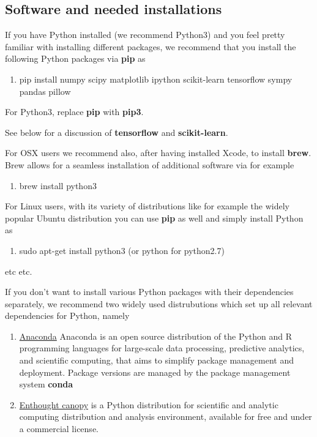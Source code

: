 \documentclass[%
oneside,                 %
final,                   %
10pt]{article}
\begin{document}
\noindent
\subsection*{Software and needed installations}

If you have Python installed (we recommend Python3) and you feel pretty familiar with installing different packages, 
we recommend that you install the following Python packages via \textbf{pip} as
\begin{enumerate}
\item pip install numpy scipy matplotlib ipython scikit-learn tensorflow sympy pandas pillow
\end{enumerate}

\noindent
For Python3, replace \textbf{pip} with \textbf{pip3}.

See below for a discussion of \textbf{tensorflow} and \textbf{scikit-learn}. 

For OSX users we recommend also, after having installed Xcode, to install \textbf{brew}. Brew allows 
for a seamless installation of additional software via for example
\begin{enumerate}
\item brew install python3
\end{enumerate}

\noindent
For Linux users, with its variety of distributions like for example the widely popular Ubuntu distribution
you can use \textbf{pip} as well and simply install Python as 
\begin{enumerate}
\item sudo apt-get install python3  (or python for python2.7)
\end{enumerate}

\noindent
etc etc. 

If you don't want to install various Python packages with their dependencies separately, we recommend two widely used distrubutions which set up  all relevant dependencies for Python, namely
\begin{enumerate}
\item \href{{https://docs.anaconda.com/}}{Anaconda} Anaconda is an open source distribution of the Python and R programming languages for large-scale data processing, predictive analytics, and scientific computing, that aims to simplify package management and deployment. Package versions are managed by the package management system \textbf{conda}

\item \href{{https://www.enthought.com/product/canopy/}}{Enthought canopy}  is a Python distribution for scientific and analytic computing distribution and analysis environment, available for free and under a commercial license.
\end{enumerate}
\end{document}
